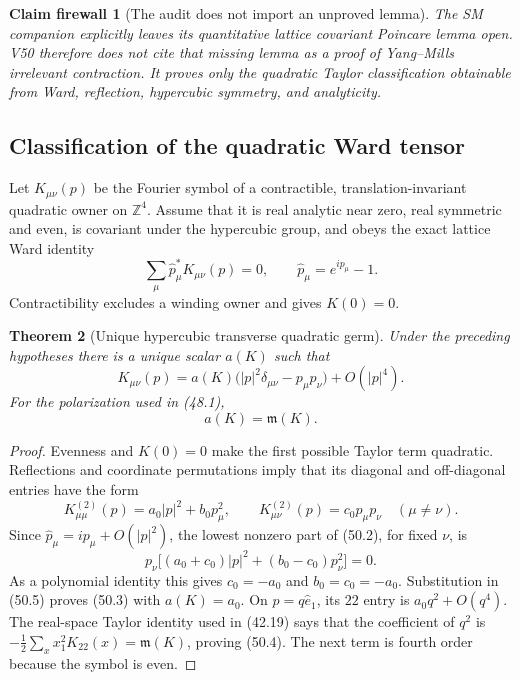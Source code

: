 \documentclass[11pt,oneside]{book}
\newtheorem{theorem}{Theorem}[chapter]
\newtheorem{firewall}[theorem]{Claim firewall}
\theoremstyle{definition}
\theoremstyle{remark}
\begin{document}
\begin{firewall}[The audit does not import an unproved lemma]
\label{fire:e8v50-audit-firewall}
The SM companion explicitly leaves its quantitative lattice
covariant Poincare lemma open.  V50 therefore does not cite that
missing lemma as a proof of Yang--Mills irrelevant contraction.
It proves only the quadratic Taylor classification obtainable from
Ward, reflection, hypercubic symmetry, and analyticity.
\end{firewall}

\subsection{Classification of the quadratic Ward tensor}

Let \(K_{\mu\nu}(p)\) be the Fourier symbol of a contractible,
translation-invariant quadratic owner on \(\mathbb Z^4\).  Assume
that it is real analytic near zero, real symmetric and even, is
covariant under the hypercubic group, and obeys the exact lattice
Ward identity
\[
 \sum_\mu\widehat p_\mu^*K_{\mu\nu}(p)=0,\qquad
 \widehat p_\mu=e^{ip_\mu}-1.                                \tag{50.2}
\]
Contractibility excludes a winding owner and gives \(K(0)=0\).

\begin{theorem}[Unique hypercubic transverse quadratic germ]
\label{thm:e8v50-quadratic-classification}
Under the preceding hypotheses there is a unique scalar \(a(K)\)
such that
\[
 K_{\mu\nu}(p)
 =a(K)\bigl(|p|^2\delta_{\mu\nu}-p_\mu p_\nu\bigr)
 +O(|p|^4).                                                   \tag{50.3}
\]
For the polarization used in (48.1),
\[
 a(K)={\mathfrak m}(K).                                      \tag{50.4}
\]
\end{theorem}

\begin{proof}
Evenness and \(K(0)=0\) make the first possible Taylor term
quadratic.  Reflections and coordinate permutations imply that its
diagonal and off-diagonal entries have the form
\[
 K_{\mu\mu}^{(2)}(p)=a_0|p|^2+b_0p_\mu^2,\qquad
 K_{\mu\nu}^{(2)}(p)=c_0p_\mu p_\nu\quad(\mu\ne\nu).           \tag{50.5}
\]
Since
\(\widehat p_\mu=ip_\mu+O(|p|^2)\), the lowest nonzero part of
(50.2), for fixed \(\nu\), is
\[
 p_\nu\bigl[(a_0+c_0)|p|^2+(b_0-c_0)p_\nu^2\bigr]=0.          \tag{50.6}
\]
As a polynomial identity this gives
\(c_0=-a_0\) and \(b_0=c_0=-a_0\).  Substitution in (50.5)
proves (50.3) with \(a(K)=a_0\).  On
\(p=q\widehat e_1\), its \(22\) entry is
\(a_0q^2+O(q^4)\).  The real-space Taylor identity used in
(42.19) says that the coefficient of \(q^2\) is
\(-\frac12\sum_xx_1^2K_{22}(x)={\mathfrak m}(K)\), proving
(50.4).  The next term is fourth order because the symbol is even.
\end{proof}
\end{document}
